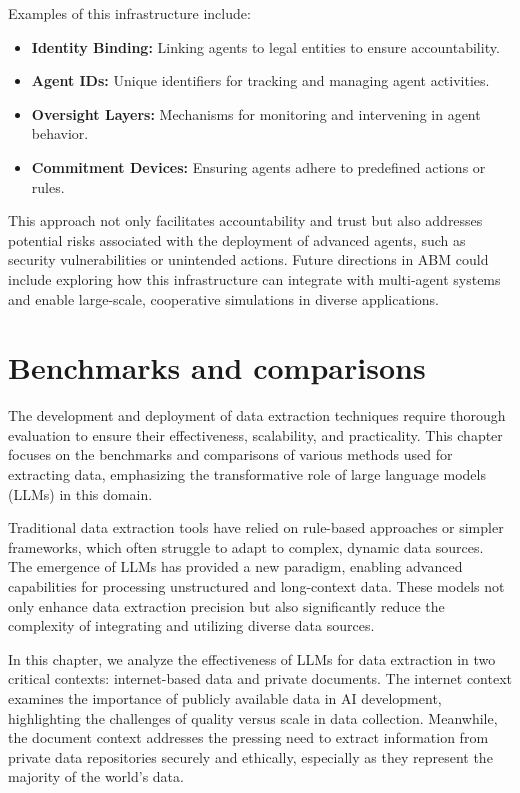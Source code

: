 Examples of this infrastructure include:
\begin{itemize}
    \item \textbf{Identity Binding:} Linking agents to legal entities to ensure accountability.
    \item \textbf{Agent IDs:} Unique identifiers for tracking and managing agent activities.
    \item \textbf{Oversight Layers:} Mechanisms for monitoring and intervening in agent behavior.
    \item \textbf{Commitment Devices:} Ensuring agents adhere to predefined actions or rules.
\end{itemize}

This approach not only facilitates accountability and trust but also addresses potential risks associated with the deployment of advanced agents, such as security vulnerabilities or unintended actions. Future directions in ABM could include exploring how this infrastructure can integrate with multi-agent systems and enable large-scale, cooperative simulations in diverse applications.



\chapter{Benchmarks and comparisons}

The development and deployment of data extraction techniques require thorough evaluation to ensure their effectiveness, scalability, and practicality. This chapter focuses on the benchmarks and comparisons of various methods used for extracting data, emphasizing the transformative role of large language models (LLMs) in this domain.

Traditional data extraction tools have relied on rule-based approaches or simpler frameworks, which often struggle to adapt to complex, dynamic data sources. The emergence of LLMs has provided a new paradigm, enabling advanced capabilities for processing unstructured and long-context data. These models not only enhance data extraction precision but also significantly reduce the complexity of integrating and utilizing diverse data sources.

In this chapter, we analyze the effectiveness of LLMs for data extraction in two critical contexts: internet-based data and private documents. The internet context examines the importance of publicly available data in AI development, highlighting the challenges of quality versus scale in data collection. Meanwhile, the document context addresses the pressing need to extract information from private data repositories securely and ethically, especially as they represent the majority of the world's data.

